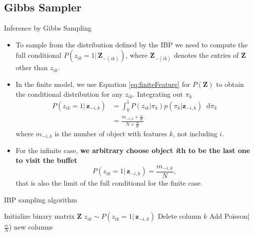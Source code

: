 \documentclass[aspectratio=169,xcolor=dvipsnames]{beamer}
\newcommand*\diff{\mathop{}\!\mathrm{d}}
\newcommand{\vecz}{\textbf{z}}
\newcommand{\matz}{\textbf{Z}}
\newcommand{\aOverK}{\frac{\alpha}{K}}
\begin{document}
\subsection{Gibbs Sampler}
\begin{frame}{Inference by Gibbs Sampling}
\setlength{\leftmargini}{0.2cm}
\begin{itemize}
\item To sample from the distribution defined by the IBP we need to compute the full conditional $P(z_{ik}=1 | \, \matz_{-(ik)})$, where $\matz_{-(ik)}$ denotes the entries of $\matz$ other than $z_{ik}$.
\item In the finite model, we use Equation \ref{eq:finiteFeature} for $P(\matz)$ to obtain the conditional distribution for any $z_{ik}$. Integrating out $\pi_k$
\begin{align*}
    P(z_{ik}=1|\, \vecz_{-i,k}) &= \int_{0}^{1}P(z_{ik}|\pi_k)p(\pi_k|\vecz_{-i,k}) \diff \pi_k \\ &=\frac{m_{-i,k}+\aOverK}{N+\aOverK}
\end{align*}
where $m_{-i,k}$  is the number of object with features $k$, not including $i$.
\item For the infinite case, \textbf{we arbitrary choose object \textit{i}th to be the last one to visit the buffet}
\begin{equation}
    P(z_{ik}=1|\, \vecz_{-i,k}) =\frac{m_{-i,k}}{N}, \label{eq:IBPGibbs}
\end{equation}
that is also the limit of the full conditional for the finite case.
\end{itemize}
\end{frame}
\begin{frame}{IBP sampling algorithm}

\begin{algorithm}[H]
\begin{algorithmic}[1]
    \STATE Initialize binary matrix $\matz$
    \STATE $z_{ik} \sim P(z_{ik}=1|\, \vecz_{-i,k})$
    \ELSE 
    \STATE Delete column $k$
    \ENDIF
    \STATE Add Poisson($\frac{\alpha}{N}$) new columns
    \ENDFOR
    \ENDFOR
    \end{algorithmic}
    \caption{Gibbs sampler for IBP}
    \label{alg:seq}
    \end{algorithm}
\end{frame}
\end{document}
